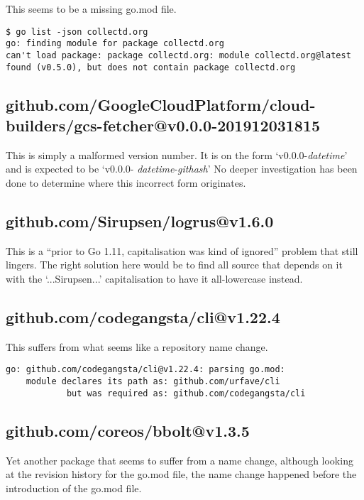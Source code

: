 \documentclass[a4paper]{paper}
\begin{document}
This seems to be a missing go.mod file.

\begin{verbatim}
$ go list -json collectd.org
go: finding module for package collectd.org
can't load package: package collectd.org: module collectd.org@latest found (v0.5.0), but does not contain package collectd.org
\end{verbatim}

\subsection{github.com/GoogleCloudPlatform/cloud-builders/gcs-fetcher@v0.0.0-201912031815}

This is simply a malformed version number. It is on the form
`v0.0.0-{\it datetime}' and is expected to be `v0.0.0-{\it
  datetime}-{\it githash}' No deeper investigation has been done to
determine where this incorrect form originates.

\subsection{github.com/Sirupsen/logrus@v1.6.0}

This is a ``prior to Go 1.11, capitalisation was kind of ignored''
problem that still lingers. The right solution here would be to find
all source that depends on it with the `...Sirupsen...' capitalisation
to have it all-lowercase instead.

\subsection{github.com/codegangsta/cli@v1.22.4}

This suffers from what seems like a repository name change.

\begin{verbatim}
go: github.com/codegangsta/cli@v1.22.4: parsing go.mod:
	module declares its path as: github.com/urfave/cli
	        but was required as: github.com/codegangsta/cli
\end{verbatim}

\subsection{github.com/coreos/bbolt@v1.3.5}

Yet another package that seems to suffer from a name change, although
looking at the revision history for the go.mod file, the name change
happened before the introduction of the go.mod file.
\end{document}
